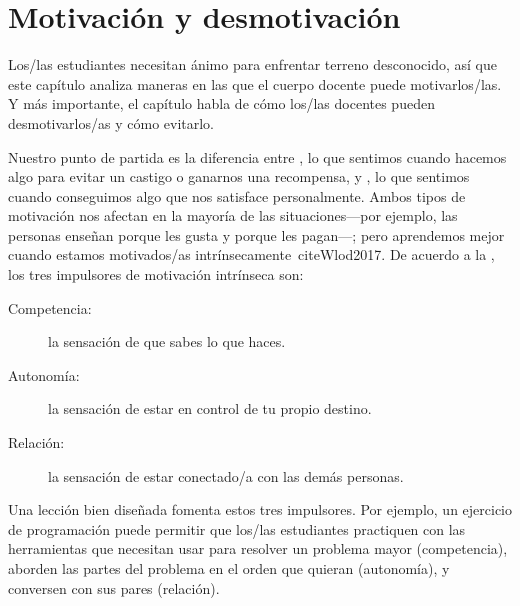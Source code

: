 \chapter{Motivación y desmotivación}\label{s:motivation}

Los/las estudiantes necesitan ánimo para enfrentar terreno desconocido,
así que este capítulo analiza maneras en las que el cuerpo docente puede motivarlos/las.
Y más importante,
el capítulo habla de cómo los/las docentes pueden desmotivarlos/as
y cómo evitarlo.

Nuestro punto de partida es la diferencia entre
,
lo que sentimos cuando hacemos algo para evitar un castigo o ganarnos una recompensa,
y ,
lo que sentimos cuando conseguimos algo que nos satisface personalmente.
Ambos tipos de motivación nos afectan en la mayoría de las situaciones---por ejemplo,
las personas enseñan porque les gusta y porque les pagan---; pero
aprendemos mejor cuando estamos motivados/as intrínsecamente~cite{Wlod2017}.
De acuerdo a la 
,
los tres impulsores de motivación intrínseca son:

\begin{description}

\item[Competencia:]
  la sensación de que sabes lo que haces. 

\item[Autonomía:]
  la sensación de estar en control de tu propio destino.

\item[Relación:]
  la sensación de estar conectado/a con las demás personas.

\end{description}

Una lección bien diseñada fomenta estos tres impulsores.
Por ejemplo,
un ejercicio de programación puede permitir que los/las estudiantes
practiquen con las herramientas que necesitan usar para resolver un problema mayor (competencia),
aborden las partes del problema en el orden que quieran (autonomía),
y conversen con sus pares (relación).

